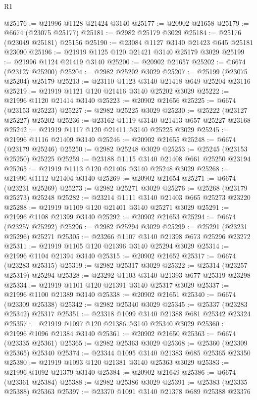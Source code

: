 \begin{lexlean}{R1}
\begin{coremodule}
@25176 := @21996 @1128 @21424 @3140
@25177 := @20902 @21658
@25179 := @6674 (@23075 @25177)
@25181 := @2982 @25179 @3029
@25184 := @25176 (@23049 @25181) @25156
@25190 := @23084 @1127 @3140 @21423 @645 @25181 @23090
@25196 := @21919 @1125 @120 @21421 @3140 @25179 @3029
@25199 := @21996 @1124 @21419 @3140
@25200 := @20902 @21657
@25202 := @6674 (@23127 @25200)
@25204 := @2982 @25202 @3029
@25207 := @25199 (@23075 @25204) @25179
@25213 := @23110 @1123 @3140 @21418 @649 @25204 @23116
@25219 := @21919 @1121 @120 @21416 @3140 @25202 @3029
@25222 := @21996 @1120 @21414 @3140
@25223 := @20902 @21656
@25225 := @6674 (@23153 @25223)
@25227 := @2982 @25225 @3029
@25230 := @25222 (@23127 @25227) @25202
@25236 := @23162 @1119 @3140 @21413 @657 @25227 @23168
@25242 := @21919 @1117 @120 @21411 @3140 @25225 @3029
@25245 := @21996 @1116 @21409 @3140
@25246 := @20902 @21655
@25248 := @6674 (@23179 @25246)
@25250 := @2982 @25248 @3029
@25253 := @25245 (@23153 @25250) @25225
@25259 := @23188 @1115 @3140 @21408 @661 @25250 @23194
@25265 := @21919 @1113 @120 @21406 @3140 @25248 @3029
@25268 := @21996 @1112 @21404 @3140
@25269 := @20902 @21654
@25271 := @6674 (@23231 @25269)
@25273 := @2982 @25271 @3029
@25276 := @25268 (@23179 @25273) @25248
@25282 := @23214 @1111 @3140 @21403 @665 @25273 @23220
@25288 := @21919 @1109 @120 @21401 @3140 @25271 @3029
@25291 := @21996 @1108 @21399 @3140
@25292 := @20902 @21653
@25294 := @6674 (@23257 @25292)
@25296 := @2982 @25294 @3029
@25299 := @25291 (@23231 @25296) @25271
@25305 := @23266 @1107 @3140 @21398 @673 @25296 @23272
@25311 := @21919 @1105 @120 @21396 @3140 @25294 @3029
@25314 := @21996 @1104 @21394 @3140
@25315 := @20902 @21652
@25317 := @6674 (@23283 @25315)
@25319 := @2982 @25317 @3029
@25322 := @25314 (@23257 @25319) @25294
@25328 := @23292 @1103 @3140 @21393 @677 @25319 @23298
@25334 := @21919 @1101 @120 @21391 @3140 @25317 @3029
@25337 := @21996 @1100 @21389 @3140
@25338 := @20902 @21651
@25340 := @6674 (@23309 @25338)
@25342 := @2982 @25340 @3029
@25345 := @25337 (@23283 @25342) @25317
@25351 := @23318 @1099 @3140 @21388 @681 @25342 @23324
@25357 := @21919 @1097 @120 @21386 @3140 @25340 @3029
@25360 := @21996 @1096 @21384 @3140
@25361 := @20902 @21650
@25363 := @6674 (@23335 @25361)
@25365 := @2982 @25363 @3029
@25368 := @25360 (@23309 @25365) @25340
@25374 := @23344 @1095 @3140 @21383 @685 @25365 @23350
@25380 := @21919 @1093 @120 @21381 @3140 @25363 @3029
@25383 := @21996 @1092 @21379 @3140
@25384 := @20902 @21649
@25386 := @6674 (@23361 @25384)
@25388 := @2982 @25386 @3029
@25391 := @25383 (@23335 @25388) @25363
@25397 := @23370 @1091 @3140 @21378 @689 @25388 @23376

\end{coremodule}
\end{lexlean}
